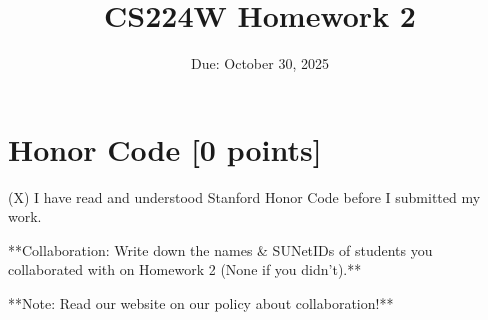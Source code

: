 \documentclass{article}
\title{CS224W Homework 2}
\date{Due: October 30, 2025}
\numberwithin{figure}{section}
\begin{document}
\maketitle








\section{Honor Code [0 points]}
(X) I have read and understood Stanford Honor Code before I submitted my
work.

**Collaboration: Write down the names \& SUNetIDs of students you collaborated with on Homework 2 (None if you didn’t).**

**Note: Read our website on our policy about collaboration!**
\end{document}
